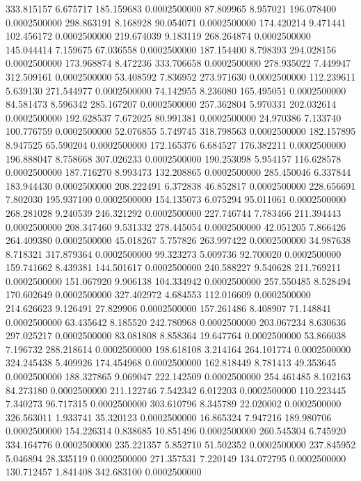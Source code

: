 333.815157 6.675717 185.159683 0.0002500000
87.809965 8.957021 196.078400 0.0002500000
298.863191 8.168928 90.054071 0.0002500000
174.420214 9.471441 102.456172 0.0002500000
219.674039 9.183119 268.264874 0.0002500000
145.044414 7.159675 67.036558 0.0002500000
187.154400 8.798393 294.028156 0.0002500000
173.968874 8.472236 333.706658 0.0002500000
278.935022 7.449947 312.509161 0.0002500000
53.408592 7.836952 273.971630 0.0002500000
112.239611 5.639130 271.544977 0.0002500000
74.142955 8.236080 165.495051 0.0002500000
84.581473 8.596342 285.167207 0.0002500000
257.362804 5.970331 202.032614 0.0002500000
192.628537 7.672025 80.991381 0.0002500000
24.970386 7.133740 100.776759 0.0002500000
52.076855 5.749745 318.798563 0.0002500000
182.157895 8.947525 65.590204 0.0002500000
172.165376 6.684527 176.382211 0.0002500000
196.888047 8.758668 307.026233 0.0002500000
190.253098 5.954157 116.628578 0.0002500000
187.716270 8.993473 132.208865 0.0002500000
285.450046 6.337844 183.944430 0.0002500000
208.222491 6.372838 46.852817 0.0002500000
228.656691 7.802030 195.937100 0.0002500000
154.135073 6.075294 95.011061 0.0002500000
268.281028 9.240539 246.321292 0.0002500000
227.746744 7.783466 211.394443 0.0002500000
208.347460 9.531332 278.445054 0.0002500000
42.051205 7.866426 264.409380 0.0002500000
45.018267 5.757826 263.997422 0.0002500000
34.987638 8.718321 317.879364 0.0002500000
99.323273 5.009736 92.700020 0.0002500000
159.741662 8.439381 144.501617 0.0002500000
240.588227 9.540628 211.769211 0.0002500000
151.067920 9.906138 104.334942 0.0002500000
257.550485 8.528494 170.602649 0.0002500000
327.402972 4.684553 112.016609 0.0002500000
214.626623 9.126491 27.829906 0.0002500000
157.261486 8.408907 71.148841 0.0002500000
63.435642 8.185520 242.780968 0.0002500000
203.067234 8.630636 297.025217 0.0002500000
83.081808 8.858364 19.647764 0.0002500000
53.866038 7.196732 288.218614 0.0002500000
198.618108 3.214164 264.101774 0.0002500000
324.245438 5.409926 174.454968 0.0002500000
162.818449 8.781413 49.353645 0.0002500000
188.327865 9.069047 222.142509 0.0002500000
254.461485 8.102163 84.273180 0.0002500000
211.122746 7.542342 6.012203 0.0002500000
110.223445 7.340273 96.717315 0.0002500000
303.610796 8.345789 22.020002 0.0002500000
326.563011 1.933741 35.320123 0.0002500000
16.865324 7.947216 189.980706 0.0002500000
154.226314 0.838685 10.851496 0.0002500000
260.545304 6.745920 334.164776 0.0002500000
235.221357 5.852710 51.502352 0.0002500000
237.845952 5.046894 28.335119 0.0002500000
271.357531 7.220149 134.072795 0.0002500000
130.712457 1.841408 342.683100 0.0002500000
